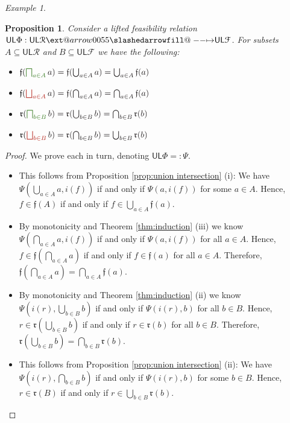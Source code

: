 \documentclass[12pt]{article}
\makeatletter
\theoremstyle{definition}
\theoremstyle{plain}
\theoremstyle{plain}
\newtheorem{proposition}[definition]{Proposition}
\theoremstyle{plain}
\theoremstyle{plain}
\theoremstyle{remark}
\newtheorem{example}[definition]{Example}
\theoremstyle{remark}
\newcommand{\mc}[1]{\mathcal{#1}}
\newcommand{\sub}{\subseteq}
\newcommand{\low}{\mathsf{L}}
\newcommand{\upper}{\mathsf{U}}
\def\slashedarrowfill@#1#2#3#4#5{%
	$\m@th\thickmuskip0mu\medmuskip\thickmuskip\thinmuskip\thickmuskip
	\relax#5#1\mkern-7mu%
	\cleaders\hbox{$#5\mkern-2mu#2\mkern-2mu$}\hfill
	\mathclap{#3}\mathclap{#2}%
	\cleaders\hbox{$#5\mkern-2mu#2\mkern-2mu$}\hfill
	\mkern-7mu#4$%
}
\def\rightslashedarrowfill@{%
	\slashedarrowfill@\relbar\relbar\mapstochar\rightarrow}
\newcommand\xslashedrightarrow[2][]{%
	\ext@arrow 0055{\rightslashedarrowfill@}{#1}{#2}}
\newcommand{\cbigsqcap}[1]{\color{OliveGreen}\bigsqcap_{#1}\color{Black}}
\newcommand{\cbigsqcup}[1]{\color{BrickRed}\bigsqcup_{#1}\color{Black}}
\makeatother
\begin{document}
\begin{example}
	
\end{example}

\begin{proposition} Consider a lifted feasibility relation $\upper\low\Phi: \upper\low\mc{R} \xslashedrightarrow{} \upper\low\mc{F}$. For subsets $A \sub \upper\low\mc{R}$ and $B \sub \upper\low\mc{F}$ we have the following:
	\begin{itemize}
		\item[(i)] $\mathfrak{f}(\cbigsqcap{a \in A} a) = \mathfrak{f}(\bigcup_{a \in A} a) = \bigcup_{a \in A}\mathfrak{f}(a)$
		\item[(ii)] $\mathfrak{f}(\cbigsqcup{a \in A} a) = \mathfrak{f}(\bigcap_{a \in A} a) = \bigcap_{a \in A}\mathfrak{f}(a)$
		\item[(iii)] $\mathfrak{r}(\cbigsqcap{b \in B} b) = \mathfrak{r}(\bigcup_{b \in B} b) = \bigcap_{b \in B}\mathfrak{r}(b)$
		\item[(iv)] $\mathfrak{r}(\cbigsqcup{b \in B} b) = \mathfrak{r}(\bigcap_{b \in B} b) = \bigcup_{b \in B}\mathfrak{r}(b)$
	\end{itemize}
\end{proposition}
\begin{proof}We prove each in turn, denoting $\upper\low\Phi =: \Psi$.
	\begin{itemize}
		\item[(i)] This follows from Proposition \ref{prop:union intersection} (i): We have $\Psi(\bigcup_{a \in A} a, i(f))$ if and only if $\Psi(a, i(f))$ for some $a \in A$. Hence, $f \in \mathfrak{f}(A)$ if and only if $f \in \bigcup_{a \in A} \mathfrak{f}(a)$.
		
		\item[(ii)] By monotonicity and Theorem \ref{thm:induction} (iii) we know $\Psi(\bigcap_{a \in A} a, i(f))$ if and only if $\Psi(a,i(f))$ for all $a \in A$. Hence, $f \in \mathfrak{f}(\bigcap_{a \in A} a) $ if and only if $f \in \mathfrak{f}(a)$ for all $a \in A$. Therefore, $\mathfrak{f}(\bigcap_{a \in A} a) = \bigcap_{a \in A}\mathfrak{f}(a)$.
		
		\item[(iii)] By monotonicity and Theorem \ref{thm:induction} (ii) we know $\Psi(i(r),\bigcup_{b \in B} b)$ if and only if $\Psi(i(r),b)$ for all $b \in B$. Hence, $r \in \mathfrak{r}(\bigcup_{b \in B}b)$ if and only if $r \in \mathfrak{r}(b)$ for all $b \in B$. Therefore, $\mathfrak{r}(\bigcup_{b \in B} b) = \bigcap_{b \in B}\mathfrak{r}(b)$.
		
		\item[(iv)] This follows from Proposition \ref{prop:union intersection} (ii): We have $\Psi(i(r), \bigcap_{b \in B} b)$ if and only if $\Psi(i(r), b)$ for some $b \in B$. Hence, $r \in \mathfrak{r}(B)$ if and only if $r \in \bigcup_{b \in B} \mathfrak{r}(b)$.
	\end{itemize}
\end{proof}
\end{document}
